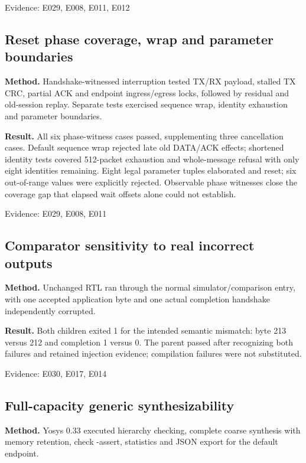 \documentclass[11pt,a4paper]{article}
\begin{document}
{\small Evidence: E029,\allowbreak{} E008,\allowbreak{} E011,\allowbreak{} E012}

\subsection{Reset phase coverage,\allowbreak{} wrap and parameter boundaries}

\textbf{Method.} Handshake-witnessed interruption tested TX/\allowbreak{}RX payload,\allowbreak{} stalled TX CRC,\allowbreak{} partial ACK and endpoint ingress/\allowbreak{}egress locks,\allowbreak{} followed by residual and old-session replay. Separate tests exercised sequence wrap,\allowbreak{} identity exhaustion and parameter boundaries.

\textbf{Result.} All six phase-witness cases passed,\allowbreak{} supplementing three cancellation cases. Default sequence wrap rejected late old DATA/\allowbreak{}ACK effects; shortened identity tests covered 512-packet exhaustion and whole-message refusal with only eight identities remaining. Eight legal parameter tuples elaborated and reset; six out-of-range values were explicitly rejected. Observable phase witnesses close the coverage gap that elapsed wait offsets alone could not establish.

{\small Evidence: E029,\allowbreak{} E008,\allowbreak{} E011}

\subsection{Comparator sensitivity to real incorrect outputs}

\textbf{Method.} Unchanged RTL ran through the normal simulator/\allowbreak{}comparison entry,\allowbreak{} with one accepted application byte and one actual completion handshake independently corrupted.

\textbf{Result.} Both children exited 1 for the intended semantic mismatch: byte 213 versus 212 and completion 1 versus 0. The parent passed after recognizing both failures and retained injection evidence; compilation failures were not substituted.

{\small Evidence: E030,\allowbreak{} E017,\allowbreak{} E014}

\subsection{Full-capacity generic synthesizability}

\textbf{Method.} Yosys 0.33 executed hierarchy checking,\allowbreak{} complete coarse synthesis with memory retention,\allowbreak{} check -assert,\allowbreak{} statistics and JSON export for the default endpoint.
\end{document}
